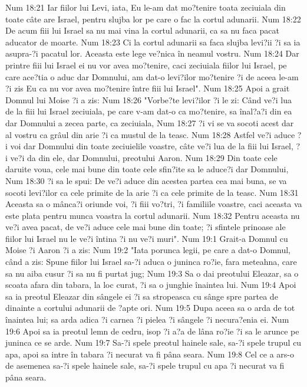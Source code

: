 Num 18:21  Iar fiilor lui Levi, iata, Eu le-am dat mo?tenire toata zeciuiala din toate câte are Israel, pentru slujba lor pe care o fac la cortul adunarii.
Num 18:22  De acum fiii lui Israel sa nu mai vina la cortul adunarii, ca sa nu faca pacat aducator de moarte.
Num 18:23  Ci la cortul adunarii sa faca slujba levi?ii ?i sa ia asupra-?i pacatul lor. Aceasta este lege ve?nica în neamul vostru.
Num 18:24  Dar printre fiii lui Israel ei nu vor avea mo?tenire, caci zeciuiala fiilor lui Israel, pe care ace?tia o aduc dar Domnului, am dat-o levi?ilor mo?tenire ?i de aceea le-am ?i zis Eu ca nu vor avea mo?tenire între fiii lui Israel".
Num 18:25  Apoi a grait Domnul lui Moise ?i a zis:
Num 18:26  "Vorbe?te levi?ilor ?i le zi: Când ve?i lua de la fiii lui Israel zeciuiala, pe care v-am dat-o ca mo?tenire, sa înal?a?i din ea dar Domnului a zecea parte, ca zeciuiala,
Num 18:27  ?i vi se va socoti acest dar al vostru ca grâul din arie ?i ca mustul de la teasc.
Num 18:28  Astfel ve?i aduce ?i voi dar Domnului din toate zeciuielile voastre, câte ve?i lua de la fiii lui Israel, ?i ve?i da din ele, dar Domnului, preotului Aaron.
Num 18:29  Din toate cele daruite voua, cele mai bune din toate cele sfin?ite sa le aduce?i dar Domnului,
Num 18:30  ?i sa le spui: De ve?i aduce din acestea partea cea mai buna, se va socoti levi?ilor ca cele primite de la arie ?i ca cele primite de la teasc.
Num 18:31  Aceasta sa o mânca?i oriunde voi, ?i fiii vo?tri, ?i familiile voastre, caci aceasta va este plata pentru munca voastra la cortul adunarii.
Num 18:32  Pentru aceasta nu ve?i avea pacat, de ve?i aduce cele mai bune din toate; ?i sfintele prinoase ale fiilor lui Israel nu le ve?i întina ?i nu ve?i muri".
Num 19:1  Grait-a Domnul cu Moise ?i Aaron ?i a zis:
Num 19:2  "Iata porunca legii, pe care a dat-o Domnul, când a zis: Spune fiilor lui Israel sa-?i aduca o juninca ro?ie, fara meteahna, care sa nu aiba cusur ?i sa nu fi purtat jug;
Num 19:3  Sa o dai preotului Eleazar, sa o scoata afara din tabara, la loc curat, ?i sa o junghie înaintea lui.
Num 19:4  Apoi sa ia preotul Eleazar din sângele ei ?i sa stropeasca cu sânge spre partea de dinainte a cortului adunarii de ?apte ori.
Num 19:5  Dupa aceea sa o arda de tot înaintea lui; sa arda adica ?i carnea ?i pielea ?i sângele ?i necura?enia ei.
Num 19:6  Apoi sa ia preotul lemn de cedru, isop ?i a?a de lâna ro?ie ?i sa le arunce pe juninca ce se arde.
Num 19:7  Sa-?i spele preotul hainele sale, sa-?i spele trupul cu apa, apoi sa intre în tabara ?i necurat va fi pâna seara.
Num 19:8  Cel ce a ars-o de asemenea sa-?i spele hainele sale, sa-?i spele trupul cu apa ?i necurat va fi pâna seara.
